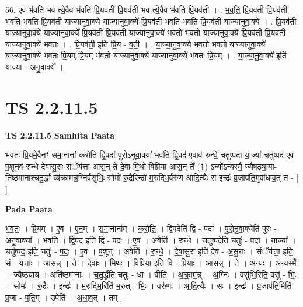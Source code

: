 \documentclass[17pt]{extarticle}
\begin{document}
56. ए॒व भ॑वति भव त्ये॒वैव भ॑वति प्रि॒यव॑ती प्रि॒यव॑ती भव त्ये॒वैव भ॑वति प्रि॒यव॑ती । . भ॒व॒ति॒ प्रि॒यव॑ती प्रि॒यव॑ती भवति भवति प्रि॒यव॑ती याज्यानुवा॒क्ये॑ याज्यानुवा॒क्ये᳚ प्रि॒यव॑ती भवति भवति प्रि॒यव॑ती याज्यानुवा॒क्ये᳚ । . प्रि॒यव॑ती याज्यानुवा॒क्ये॑ याज्यानुवा॒क्ये᳚ प्रि॒यव॑ती प्रि॒यव॑ती याज्यानुवा॒क्ये॑ भवतो भवतो याज्यानुवा॒क्ये᳚ प्रि॒यव॑ती प्रि॒यव॑ती याज्यानुवा॒क्ये॑ भवतः । . प्रि॒यव॑ती॒ इति॑ प्रि॒य - व॒ती॒ । . या॒ज्या॒नु॒वा॒क्ये॑ भवतो भवतो याज्यानुवा॒क्ये॑ याज्यानुवा॒क्ये॑ भवतः प्रि॒यम् प्रि॒यम् भ॑वतो याज्यानुवा॒क्ये॑ याज्यानुवा॒क्ये॑ भवतः प्रि॒यम् । . या॒ज्या॒नु॒वा॒क्ये॑ इति॑ याज्या - अ॒नु॒वा॒क्ये᳚ । \newline
\pagebreak
{}

\section{ TS 2.2.11.5 }

\textbf{TS 2.2.11.5 } \newline
\textbf{Samhita Paata} \newline

भवतः प्रि॒यमे॒वैनꣳ॑ समा॒नानां᳚ करोति द्वि॒पदा॑ पुरोऽनुवा॒क्या॑ भवति द्वि॒पद॑ ए॒वाव॑ रुन्धे॒ चतु॑ष्पदा या॒ज्या॑ चतु॑ष्पद ए॒व प॒शूनव॑ रुन्धे देवासु॒राः संॅय॑त्ता आस॒न् ते दे॒वा मि॒थो विप्रि॑या आस॒न् ते᳚ (1॒) ऽन्यो᳚ऽन्यस्मै॒ ज्यैष्‌ठ्या॒या-ति॑ष्ठमानाश्चतु॒र्द्धा व्य॑क्रामन्न॒ग्निर्वसु॑भिः॒ सोमो॑ रु॒द्रैरिन्द्रो॑ म॒रुद्भि॒र्वरु॑ण आदि॒त्यैः स इन्द्रः॑ प्र॒जाप॑ति॒मुपा॑धाव॒त् त - [  ] \newline

\textbf{Pada Paata} \newline

भ॒व॒तः॒ । प्रि॒यम् । ए॒व । ए॒न॒म् । स॒मा॒नाना᳚म् । क॒रो॒ति॒ । द्वि॒पदेति॑ द्वि - पदा᳚ । पु॒रो॒नु॒वा॒क्येति॑ पुरः - अ॒नु॒वा॒क्या᳚ । भ॒व॒ति॒ । द्वि॒पद॒ इति॑ द्वि - पदः॑ । ए॒व । अवेति॑ । रु॒न्धे॒ । चतु॑ष्प॒देति॒ चतुः॑ - प॒दा॒ । या॒ज्या᳚ । चतु॑ष्पद॒ इति॒ चतुः॑ - प॒दः॒ । ए॒व । प॒शून् । अवेति॑ । रु॒न्धे॒ । दे॒वा॒सु॒रा इति॑ देव - अ॒सु॒राः । संॅय॑त्ता॒ इति॒ सं - य॒त्ताः॒ । आ॒स॒न्न् । ते । दे॒वाः । मि॒थः । विप्रि॑या॒ इति॒ वि - प्रि॒याः॒ । आ॒स॒न्न् । ते । अ॒न्यः । अ॒न्यस्मै᳚ । ज्यैष्ठ्या॑य । अति॑ष्ठमानाः । च॒तु॒र्द्धेति॑ चतुः - धा । वीति॑ । अ॒क्रा॒म॒न्न् । अ॒ग्निः । वसु॑भि॒रिति॒ वसु॑ - भिः॒ । सोमः॑ । रु॒द्रैः । इन्द्रः॑ । म॒रुद्भि॒रिति॑ म॒रुत् - भिः॒ । वरु॑णः । आ॒दि॒त्यैः । सः । इन्द्रः॑ । प्र॒जाप॑ति॒मिति॑ प्र॒जा - प॒ति॒म् । उपेति॑ । अ॒धा॒व॒त् । तम् ।  \newline
\end{document}
